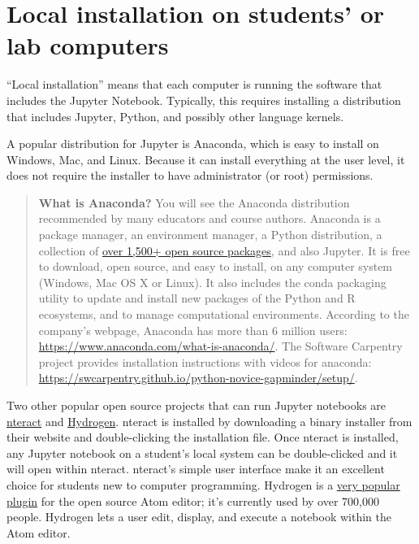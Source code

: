 \documentclass[]{book}
\begin{document}
\section{Local installation on students' or lab
computers}\label{local-installation-on-students-or-lab-computers}

``Local installation'' means that each computer is running the software
that includes the Jupyter Notebook. Typically, this requires installing
a distribution that includes Jupyter, Python, and possibly other
language kernels.

A popular distribution for Jupyter is Anaconda, which is easy to install
on Windows, Mac, and Linux. Because it can install everything at the
user level, it does not require the installer to have administrator (or
root) permissions.

\begin{quote}
\textbf{What is Anaconda?} You will see the Anaconda distribution
recommended by many educators and course authors. Anaconda is a package
manager, an environment manager, a Python distribution, a collection of
\href{https://docs.anaconda.com/anaconda/packages/pkg-docs/}{over 1,500+
open source packages}, and also Jupyter. It is free to download, open
source, and easy to install, on any computer system (Windows, Mac OS X
or Linux). It also includes the conda packaging utility to update and
install new packages of the Python and R ecosystems, and to manage
computational environments. According to the company's webpage, Anaconda
has more than 6 million users:
\url{https://www.anaconda.com/what-is-anaconda/}. The Software Carpentry
project provides installation instructions with videos for anaconda:
\url{https://swcarpentry.github.io/python-novice-gapminder/setup/}.
\end{quote}

Two other popular open source projects that can run Jupyter notebooks
are \href{https://nteract.io/}{nteract} and
\href{https://nteract.io/atom}{Hydrogen}. nteract is installed by
downloading a binary installer from their website and double-clicking
the installation file. Once nteract is installed, any Jupyter notebook
on a student's local system can be double-clicked and it will open
within nteract. nteract's simple user interface make it an excellent
choice for students new to computer programming. Hydrogen is a
\href{https://atom.io/packages/hydrogen}{very popular plugin} for the
open source Atom editor; it's currently used by over 700,000 people.
Hydrogen lets a user edit, display, and execute a notebook within the
Atom editor.
\end{document}
